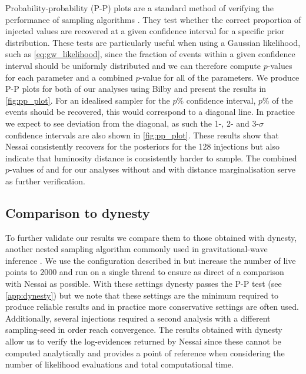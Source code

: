 \documentclass[%
 reprint,
nofootinbib,
 amsmath,amssymb,
 aps,
 prd,
]{revtex4-2}
\newcommand{\nessai}{{\sc Nessai}\xspace}
\newcommand{\bilby}{{\sc Bilby}\xspace}
\newcommand{\dynesty}{{\sc dynesty}\xspace}
\begin{document}
Probability-probability (P-P) plots are a standard method of verifying the performance of sampling algorithms \cite{Cook:2006pp,Talts:2018pp}. They test whether the correct proportion of injected values are recovered at a given confidence interval for a specific prior distribution. These tests are particularly useful when using a Gaussian likelihood, such as \cref{eq:gw_likelihood}, since the fraction of events within a given confidence interval should be uniformly distributed and we can therefore compute $p$-values for each parameter and a combined $p$-value for all of the parameters. We produce P-P plots for both of our analyses using \bilby and present the results in \cref{fig:pp_plot}. For an idealised sampler for the $p\%$ confidence interval, $p\%$ of the events should be recovered, this would correspond to a diagonal line. In practice we expect to see deviation from the diagonal, as such the 1-, 2- and 3-$\sigma$ confidence intervals are also shown in \cref{fig:pp_plot}. These results show that \nessai consistently recovers for the posteriors for the 128 injections but also indicate that luminosity distance is consistently harder to sample. The combined $p$-values of \nessaipvalue and \nessaipvaluemarg for our analyses without and with distance marginalisation serve as further verification.

\subsection{Comparison to \dynesty}

 To further validate our results we compare them to those obtained with \dynesty \cite{Speagle:2020}, another nested sampling algorithm commonly used in gravitational-wave inference \cite{Ashton:2019,Romero-Shaw:2020}. We use the configuration described in \cite{Romero-Shaw:2020} but increase the number of live points to 2000 and run on a single thread to ensure as direct of a comparison with \nessai as possible. With these settings \dynesty passes the P-P test (see \cref{app:dynesty}) but we note that these settings are the minimum required to produce reliable results and in practice more conservative settings are often used. Additionally, several injections required a second analysis with a different sampling-seed in order reach convergence. The results obtained with \dynesty allow us to verify the log-evidences returned by \nessai since these cannot be computed analytically and provides a point of reference when considering the number of likelihood evaluations and total computational time.
\end{document}
